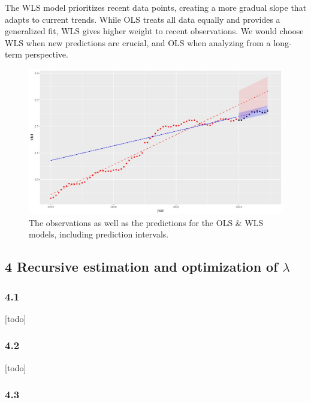 \documentclass[
]{article}
\begin{document}
The WLS model prioritizes recent data points, creating a more gradual
slope that adapts to current trends. While OLS treats all data equally
and provides a generalized fit, WLS gives higher weight to recent
observations. We would choose WLS when new predictions are crucial, and
OLS when analyzing from a long-term perspective.

\begin{figure}

{\centering \includegraphics[width=0.7\linewidth]{plots/ols_wls_prediction} 

}

\caption{The observations as well as the predictions for the OLS \& WLS models, including prediction intervals.}\label{fig:unnamed-chunk-5}
\end{figure}

\subsection{\texorpdfstring{4 Recursive estimation and optimization of
\(\lambda\)}{4 Recursive estimation and optimization of \textbackslash lambda}}\label{recursive-estimation-and-optimization-of-lambda}

\subsubsection{4.1}\label{section-13}

{[}todo{]}

\subsubsection{4.2}\label{section-14}

{[}todo{]}

\subsubsection{4.3}\label{section-15}
\end{document}
